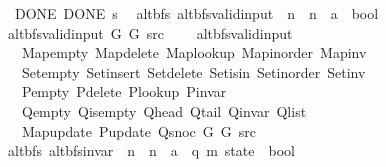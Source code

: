 \begin{isabellebody}
\ \ \ DONE{\isacharcolon}{\kern0pt}\ {\isachardoublequoteopen}DONE\ s{\isachardoublequoteclose}\isanewline
\isanewline
{}\isamarkupfalse%
\ {\isacharparenleft}{\kern0pt}\ alt{\isacharunderscore}{\kern0pt}bfs{\isacharparenright}{\kern0pt}\ alt{\isacharunderscore}{\kern0pt}bfs{\isacharunderscore}{\kern0pt}valid{\isacharunderscore}{\kern0pt}input{\isacharprime}{\kern0pt}\ {\isacharcolon}{\kern0pt}{\isacharcolon}{\kern0pt}\ {\isachardoublequoteopen}{\isacharprime}{\kern0pt}n\ {\isasymRightarrow}\ {\isacharprime}{\kern0pt}n\ {\isasymRightarrow}\ {\isacharprime}{\kern0pt}a\ {\isasymRightarrow}\ bool{\isachardoublequoteclose}\ \isanewline
\ \ {\isachardoublequoteopen}alt{\isacharunderscore}{\kern0pt}bfs{\isacharunderscore}{\kern0pt}valid{\isacharunderscore}{\kern0pt}input{\isacharprime}{\kern0pt}\ G{}\ G{}\ src\ {\isasymequiv}\isanewline
\ \ \ alt{\isacharunderscore}{\kern0pt}bfs{\isacharunderscore}{\kern0pt}valid{\isacharunderscore}{\kern0pt}input\isanewline
\ \ \ \ Map{\isacharunderscore}{\kern0pt}empty\ Map{\isacharunderscore}{\kern0pt}delete\ Map{\isacharunderscore}{\kern0pt}lookup\ Map{\isacharunderscore}{\kern0pt}inorder\ Map{\isacharunderscore}{\kern0pt}inv\isanewline
\ \ \ \ Set{\isacharunderscore}{\kern0pt}empty\ Set{\isacharunderscore}{\kern0pt}insert\ Set{\isacharunderscore}{\kern0pt}delete\ Set{\isacharunderscore}{\kern0pt}isin\ Set{\isacharunderscore}{\kern0pt}inorder\ Set{\isacharunderscore}{\kern0pt}inv\isanewline
\ \ \ \ P{\isacharunderscore}{\kern0pt}empty\ P{\isacharunderscore}{\kern0pt}delete\ P{\isacharunderscore}{\kern0pt}lookup\ P{\isacharunderscore}{\kern0pt}invar\isanewline
\ \ \ \ Q{\isacharunderscore}{\kern0pt}empty\ Q{\isacharunderscore}{\kern0pt}is{\isacharunderscore}{\kern0pt}empty\ Q{\isacharunderscore}{\kern0pt}head\ Q{\isacharunderscore}{\kern0pt}tail\ Q{\isacharunderscore}{\kern0pt}invar\ Q{\isacharunderscore}{\kern0pt}list\isanewline
\ \ \ \ Map{\isacharunderscore}{\kern0pt}update\ P{\isacharunderscore}{\kern0pt}update\ Q{\isacharunderscore}{\kern0pt}snoc\ G{}\ G{}\ src{\isachardoublequoteclose}\isanewline
\isanewline
{}\isamarkupfalse%
\ {\isacharparenleft}{\kern0pt}\ alt{\isacharunderscore}{\kern0pt}bfs{\isacharparenright}{\kern0pt}\ alt{\isacharunderscore}{\kern0pt}bfs{\isacharunderscore}{\kern0pt}invar{\isacharprime}{\kern0pt}\ {\isacharcolon}{\kern0pt}{\isacharcolon}{\kern0pt}\ {\isachardoublequoteopen}{\isacharprime}{\kern0pt}n\ {\isasymRightarrow}\ {\isacharprime}{\kern0pt}n\ {\isasymRightarrow}\ {\isacharprime}{\kern0pt}a\ {\isasymRightarrow}\ {\isacharparenleft}{\kern0pt}{\isacharprime}{\kern0pt}q{\isacharcomma}{\kern0pt}\ {\isacharprime}{\kern0pt}m{\isacharparenright}{\kern0pt}\ state\ {\isasymRightarrow}\ bool{\isachardoublequoteclose}\ \isanewline

\end{isabellebody}
